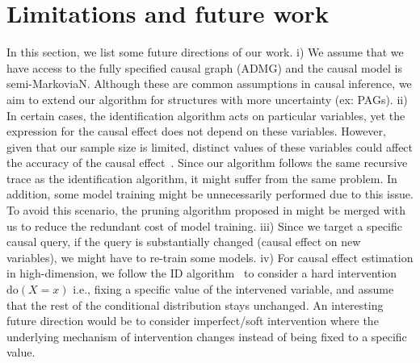 \documentclass{article}
\newcommand{\Do}{\text{do}}
\theoremstyle{plain}
\theoremstyle{definition}
\theoremstyle{remark}
\begin{document}
\section{Limitations and future work}
\label{appex-limitations}
In this section, we list some future directions of our work.
i) We assume that we have access to the fully specified causal graph (ADMG) and the causal model is semi-MarkoviaN. Although these are common assumptions in causal inference, we aim to extend our algorithm for structures with more uncertainty (ex: PAGs). 
ii) In certain cases, the identification algorithm acts on particular variables, yet the expression for the causal effect does not depend on these variables. However, given that our sample size is limited, distinct values of these variables could affect the accuracy of the causal effect~\citep{helske2021estimation}. 
Since our algorithm follows the same recursive trace as the identification algorithm, it might suffer from the same problem. In addition, some model training might be unnecessarily performed due to this issue. To avoid this scenario, 
the pruning algorithm proposed in \cite{tikka2018enhancing} might be merged with us to reduce the redundant cost of model training. 
iii) Since we target a specific causal query, if the query is substantially changed (causal effect on new variables), we might have to re-train some models. iv) For causal effect estimation in high-dimension, we follow the ID algorithm~\citep{shpitser2006identification} to consider a hard intervention $\Do(X=x)$  i.e., fixing a specific value of the intervened variable, and assume that the rest of the conditional distribution stays unchanged.
An interesting future direction would be to consider imperfect/soft intervention where the underlying mechanism of intervention changes instead of being fixed to a specific value.
%
\end{document}
